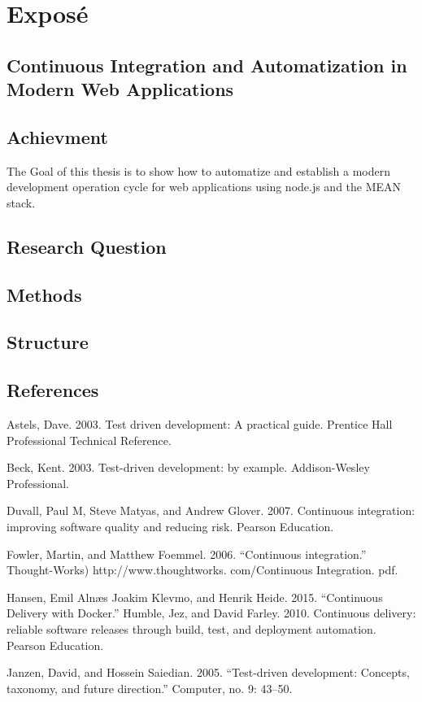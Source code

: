 \section{Exposé}

\subsection{Continuous Integration and Automatization in Modern Web Applications}

\subsection{Achievment}
The Goal of this thesis is to show how to automatize and establish a modern development operation cycle for
web applications using node.js and the MEAN stack.

\subsection{Research Question}
\subsection{Methods}
\subsection{Structure}
\subsection{References}

Astels, Dave. 2003. Test driven development: A practical guide. Prentice Hall Professional Technical Reference.

Beck, Kent. 2003. Test-driven development: by example. Addison-Wesley Professional.

Duvall, Paul M, Steve Matyas, and Andrew Glover. 2007. Continuous integration: improving software quality and reducing risk. Pearson Education.

Fowler, Martin, and Matthew Foemmel. 2006. “Continuous integration.” Thought-Works) http://www.thoughtworks. com/Continuous Integration. pdf.

Hansen, Emil Alnæs Joakim Klevmo, and Henrik Heide. 2015. “Continuous Delivery with Docker.” Humble, Jez, and David Farley. 2010. Continuous delivery: reliable software releases through build, test, and deployment automation. Pearson Education.

Janzen, David, and Hossein Saiedian. 2005. “Test-driven development: Concepts, taxonomy, and future direction.” Computer, no. 9: 43–50.


